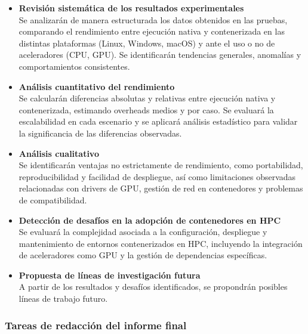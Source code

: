 \begin{itemize}
      \item \textbf{Revisión sistemática de los resultados experimentales} \\
            Se analizarán de manera estructurada los datos obtenidos en las pruebas, comparando el rendimiento entre ejecución nativa y contenerizada en las distintas plataformas (Linux, Windows, macOS) y ante el uso o no de aceleradores (CPU, GPU). Se identificarán tendencias generales, anomalías y comportamientos consistentes.

      \item \textbf{Análisis cuantitativo del rendimiento} \\
            Se calcularán diferencias absolutas y relativas entre ejecución nativa y contenerizada, estimando overheads medios y por caso. Se evaluará la escalabilidad en cada escenario y se aplicará análisis estadístico para validar la significancia de las diferencias observadas.

      \item \textbf{Análisis cualitativo} \\
            Se identificarán ventajas no estrictamente de rendimiento, como portabilidad, reproducibilidad y facilidad de despliegue, así como limitaciones observadas relacionadas con drivers de GPU, gestión de red en contenedores y problemas de compatibilidad.

      \item \textbf{Detección de desafíos en la adopción de contenedores en HPC} \\
            Se evaluará la complejidad asociada a la configuración, despliegue y mantenimiento de entornos contenerizados en HPC, incluyendo la integración de aceleradores como GPU y la gestión de dependencias específicas.

      \item \textbf{Propuesta de líneas de investigación futura} \\
            A partir de los resultados y desafíos identificados, se propondrán posibles líneas de trabajo futuro.
\end{itemize}

\subsubsection{Tareas de redacción del informe final}\label{subsubsec:tareas_redaccion}

